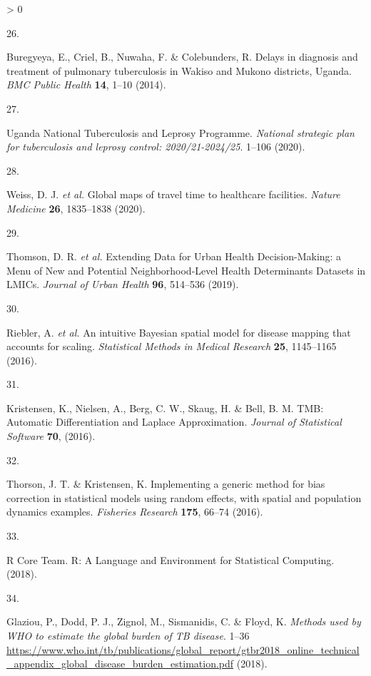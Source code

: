 \documentclass[
]{article}
\newlength{\cslhangindent}
\newlength{\csllabelwidth}
\newenvironment{CSLReferences}[2] %
 {%
  \setlength{\parindent}{0pt}
  \ifodd #1 \everypar{\setlength{\hangindent}{\cslhangindent}}\ignorespaces\fi
  \ifnum #2 > 0
  \setlength{\parskip}{#2\baselineskip}
  \fi
 }%
 {}
\newcommand{\CSLLeftMargin}[1]{\parbox[t]{\csllabelwidth}{#1}}
\newcommand{\CSLRightInline}[1]{\parbox[t]{\linewidth - \csllabelwidth}{#1}\break}
\begin{document}
\begin{CSLReferences}{0}{0}
\leavevmode\hypertarget{ref-Buregyeya2014}{}%
\CSLLeftMargin{26. }
\CSLRightInline{Buregyeya, E., Criel, B., Nuwaha, F. \& Colebunders, R. {Delays in diagnosis and treatment of pulmonary tuberculosis in Wakiso and Mukono districts, Uganda}. \emph{BMC Public Health} \textbf{14}, 1--10 (2014).}

\leavevmode\hypertarget{ref-UgandaNationalTuberculosisandLeprosyProgramme2020a}{}%
\CSLLeftMargin{27. }
\CSLRightInline{Uganda National Tuberculosis and Leprosy Programme. \emph{{National strategic plan for tuberculosis and leprosy control: 2020/21-2024/25}}. 1--106 (2020).}

\leavevmode\hypertarget{ref-Weiss2020}{}%
\CSLLeftMargin{28. }
\CSLRightInline{Weiss, D. J. \emph{et al.} {Global maps of travel time to healthcare facilities}. \emph{Nature Medicine} \textbf{26}, 1835--1838 (2020).}

\leavevmode\hypertarget{ref-Thomson2019}{}%
\CSLLeftMargin{29. }
\CSLRightInline{Thomson, D. R. \emph{et al.} {Extending Data for Urban Health Decision-Making: a Menu of New and Potential Neighborhood-Level Health Determinants Datasets in LMICs}. \emph{Journal of Urban Health} \textbf{96}, 514--536 (2019).}

\leavevmode\hypertarget{ref-Riebler2016}{}%
\CSLLeftMargin{30. }
\CSLRightInline{Riebler, A. \emph{et al.} {An intuitive Bayesian spatial model for disease mapping that accounts for scaling}. \emph{Statistical Methods in Medical Research} \textbf{25}, 1145--1165 (2016).}

\leavevmode\hypertarget{ref-Kristensen2016}{}%
\CSLLeftMargin{31. }
\CSLRightInline{Kristensen, K., Nielsen, A., Berg, C. W., Skaug, H. \& Bell, B. M. {TMB: Automatic Differentiation and Laplace Approximation}. \emph{Journal of Statistical Software} \textbf{70}, (2016).}

\leavevmode\hypertarget{ref-Thorson2016}{}%
\CSLLeftMargin{32. }
\CSLRightInline{Thorson, J. T. \& Kristensen, K. {Implementing a generic method for bias correction in statistical models using random effects, with spatial and population dynamics examples}. \emph{Fisheries Research} \textbf{175}, 66--74 (2016).}

\leavevmode\hypertarget{ref-RCoreTeam2018}{}%
\CSLLeftMargin{33. }
\CSLRightInline{R Core Team. {R: A Language and Environment for Statistical Computing}. (2018).}

\leavevmode\hypertarget{ref-Glaziou2018}{}%
\CSLLeftMargin{34. }
\CSLRightInline{Glaziou, P., Dodd, P. J., Zignol, M., Sismanidis, C. \& Floyd, K. \emph{{Methods used by WHO to estimate the global burden of TB disease}}. 1--36 \url{https://www.who.int/tb/publications/global_report/gtbr2018_online_technical_appendix_global_disease_burden_estimation.pdf} (2018).}


\end{CSLReferences}
\end{document}
